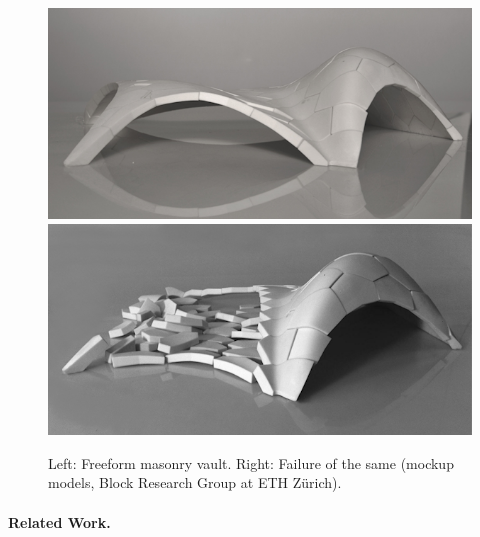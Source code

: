 \documentclass[annual]{acmsiggraph}
\begin{document}
	\begin{figure}[t]
\includegraphics[height=.245\columnwidth]{fotos/project_24_77.png}\hfill
\includegraphics[height=.245\columnwidth]{fotos/project_24_81.png}
	\caption{Left: Freeform masonry vault. Right: Failure of the same
(mock\dash up models, Block Research Group at
ETH Z\"urich).}
	\label{fig:block}
	\end{figure}


\paragraph{Related Work.}
\end{document}
